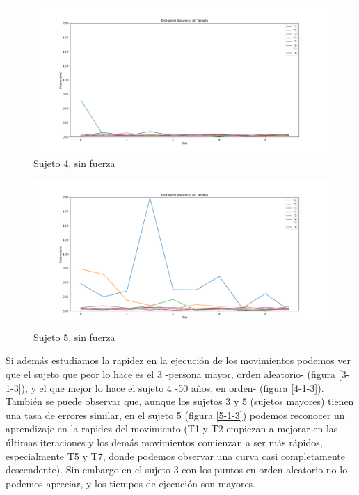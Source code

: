 \documentclass[a4paper,11pt, oneside]{book}
\begin{document}
\begin{figure}[H]
	\centering
	\includegraphics[width=\linewidth]{sujeto4/no_force/evolution_distance}
	\caption{Sujeto 4, sin fuerza}
	\label{4-1-2}
\end{figure}
\begin{figure}[H]
	\centering
	\includegraphics[width=\linewidth]{sujeto5/no_force/evolution_distance}
	\caption{Sujeto 5, sin fuerza}
	\label{5-1-2}
\end{figure}


Si además estudiamos la rapidez en la ejecución de los movimientos podemos ver que el sujeto que peor lo hace es el 3 -persona mayor, orden aleatorio- (figura \ref{3-1-3}), y el que mejor lo hace el sujeto 4 -50 años, en orden- (figura \ref{4-1-3}). También se puede observar que, aunque los sujetos 3 y 5 (sujetos mayores) tienen una tasa de errores similar, en el sujeto 5 (figura \ref{5-1-3}) podemos reconocer un aprendizaje en la rapidez del movimiento (T1 y T2 empiezan a mejorar en las últimas iteraciones y los demás movimientos comienzan a ser más rápidos, especialmente T5 y T7, donde podemos observar una curva casi completamente descendente). Sin embargo en el sujeto 	3 con los puntos en orden aleatorio no lo podemos apreciar, y los tiempos de ejecución son mayores.
\end{document}
